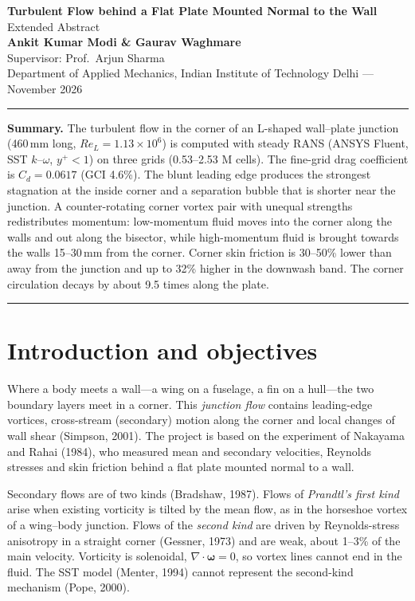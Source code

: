 \documentclass[11pt,a4paper]{article}
\newcommand{\Cd}{C_d}
\begin{document}
\begin{center}
{\Large\bfseries Turbulent Flow behind a Flat Plate Mounted Normal to the Wall}\\[4pt]
{\large Extended Abstract}\\[6pt]
\textbf{Ankit Kumar Modi \& Gaurav Waghmare}\\[2pt]
Supervisor: Prof.\ Arjun Sharma\\[2pt]
Department of Applied Mechanics, Indian Institute of Technology Delhi --- November 2026
\end{center}
\vspace{-2pt}
\hrule
\vspace{4pt}

{\small
\textbf{Summary.} The turbulent flow in the corner of an L-shaped wall--plate junction (460\,mm long, $Re_L = 1.13\times10^{6}$) is computed with steady RANS (ANSYS Fluent, SST $k$--$\omega$, $y^+<1$) on three grids (0.53--2.53 M cells). The fine-grid drag coefficient is $\Cd = 0.0617$ (GCI 4.6\%). The blunt leading edge produces the strongest stagnation at the inside corner and a separation bubble that is shorter near the junction. A counter-rotating corner vortex pair with unequal strengths redistributes momentum: low-momentum fluid moves into the corner along the walls and out along the bisector, while high-momentum fluid is brought towards the walls 15--30\,mm from the corner. Corner skin friction is 30--50\% lower than away from the junction and up to 32\% higher in the downwash band. The corner circulation decays by about 9.5 times along the plate.
\par}
\vspace{2pt}
\hrule

\section{Introduction and objectives}
Where a body meets a wall---a wing on a fuselage, a fin on a hull---the two boundary layers meet in a corner. This \emph{junction flow} contains leading-edge vortices, cross-stream (secondary) motion along the corner and local changes of wall shear (Simpson, 2001). The project is based on the experiment of Nakayama and Rahai (1984), who measured mean and secondary velocities, Reynolds stresses and skin friction behind a flat plate mounted normal to a wall.

Secondary flows are of two kinds (Bradshaw, 1987). Flows of \emph{Prandtl's first kind} arise when existing vorticity is tilted by the mean flow, as in the horseshoe vortex of a wing--body junction. Flows of the \emph{second kind} are driven by Reynolds-stress anisotropy in a straight corner (Gessner, 1973) and are weak, about 1--3\% of the main velocity. Vorticity is solenoidal, $\nabla\cdot\boldsymbol{\omega}=0$, so vortex lines cannot end in the fluid. The SST model (Menter, 1994) cannot represent the second-kind mechanism (Pope, 2000).
\end{document}
